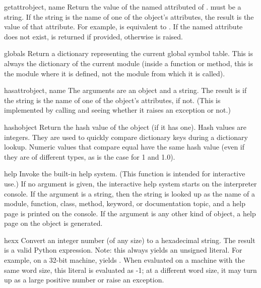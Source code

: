 \begin{funcdesc}{getattr}{object, name}
  Return the value of the named attributed of .  
  must be a string.  If the string is the name of one of the object's
  attributes, the result is the value of that attribute.  For example,
   is equivalent to .  If the
  named attribute does not exist,  is returned if provided,
  otherwise  is raised.
\end{funcdesc}

\begin{funcdesc}{globals}{}
  Return a dictionary representing the current global symbol table.
  This is always the dictionary of the current module (inside a
  function or method, this is the module where it is defined, not the
  module from which it is called).
\end{funcdesc}

\begin{funcdesc}{hasattr}{object, name}
  The arguments are an object and a string.  The result is  if the
  string is the name of one of the object's attributes,  if not.
  (This is implemented by calling  and seeing whether it raises an exception or not.)
\end{funcdesc}

\begin{funcdesc}{hash}{object}
  Return the hash value of the object (if it has one).  Hash values
  are integers.  They are used to quickly compare dictionary
  keys during a dictionary lookup.  Numeric values that compare equal
  have the same hash value (even if they are of different types, as is
  the case for 1 and 1.0).
\end{funcdesc}

\begin{funcdesc}{help}{}
  Invoke the built-in help system.  (This function is intended for
  interactive use.)  If no argument is given, the interactive help
  system starts on the interpreter console.  If the argument is a
  string, then the string is looked up as the name of a module,
  function, class, method, keyword, or documentation topic, and a
  help page is printed on the console.  If the argument is any other
  kind of object, a help page on the object is generated.
\end{funcdesc}

\begin{funcdesc}{hex}{x}
  Convert an integer number (of any size) to a hexadecimal string.
  The result is a valid Python expression.  Note: this always yields
  an unsigned literal.  For example, on a 32-bit machine,
   yields .  When evaluated on a
  machine with the same word size, this literal is evaluated as -1; at
  a different word size, it may turn up as a large positive number or
  raise an  exception.
\end{funcdesc}

